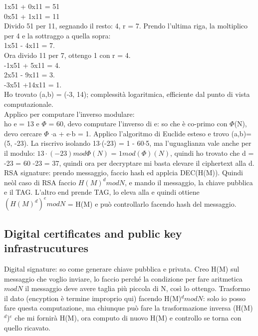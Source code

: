 \documentclass[16px]{article}
\begin{document}
1x51 + 0x11 = 51\\
0x51 + 1x11 = 11\\
Divido 51 per 11, segnando il resto: 4, r = 7. Prendo l'ultima riga, la moltiplico per 4 e la sottraggo a quella sopra:\\
1x51 - 4x11 = 7.\\ Ora divido 11 per 7, ottengo 1 con r = 4.\\ -1x51 + 5x11 = 4.\\
2x51 - 9x11 = 3.\\ -3x51 +14x11 = 1.\\ Ho trovato (a,b) = (-3, 14); complessità logaritmica, efficiente dal punto di vista computazionale.\\ Applico per computare l'inverso modulare: \\ ho e = 13 e $\Phi$ = 60, devo computare l'inverso di e: so che è co-primo con $\Phi$(N), devo cercare $\Phi$ $\cdot$a + e$\cdot$b = 1. Applico l'algoritmo di Euclide esteso e trovo (a,b)=(5, -23). La riscrivo isolando 13$\cdot$(-23)  = 1 - 60$\cdot$5, ma l'uguaglianza vale anche per il modulo: $13\cdot(-23)mod\Phi(N)$ = $1mod(\Phi)(N)$, quindi ho trovato che d = -23 = 60 -23 = 37, quindi ora per decryptare mi basta elevare il ciphertext alla d.
\\RSA signature: prendo messaggio, faccio hash ed applcia DEC(H(M)). Quindi neòl caso di RSA faccio $H(M)^dmodN$, e mando il messaggio, la chiave pubblica e il TAG. L'altro end prende TAG, lo eleva alla e quindi ottiene $(H(M)^d)^emodN$ = H(M) e può controllarlo facendo hash del messaggio.
\subsection{Digital certificates and public key infrastrucutures}
Digital signature: so come generare chiave pubblica e privata. Creo H(M) sul messaggio che voglio inviare, lo faccio perché la condizione per fare aritmetica $modN$ il messaggio deve avere taglia più piccola di N, così lo ottengo. Trasformo il dato (encyption è termine improprio qui) facendo H(M)$^dmodN$: solo io posso fare questa computazione, ma chiunque può fare la trasformazione inversa (H(M)$^d$)$^e$ che mi fornirà H(M), ora computo di nuovo H(M) e controllo se torna con quello ricavato.
\end{document}
